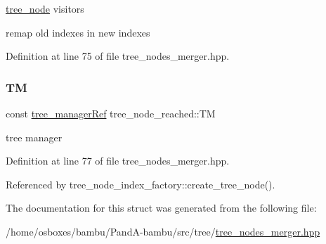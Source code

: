\hyperlink{classtree__node}{tree\+\_\+node} visitors 

remap old indexes in new indexes 

Definition at line 75 of file tree\+\_\+nodes\+\_\+merger.\+hpp.

\mbox{\label{structtree__node__reached_a2248f7cf1f977c15d487f5bdcc6ed586}} 
\subsubsection{\texorpdfstring{TM}{TM}}
{\footnotesize\ttfamily const \hyperlink{tree__manager_8hpp_a96ff150c071ce11a9a7a1e40590f205e}{tree\+\_\+manager\+Ref} tree\+\_\+node\+\_\+reached\+::\+TM\hspace{0.3cm}{\ttfamily [private]}}



tree manager 



Definition at line 77 of file tree\+\_\+nodes\+\_\+merger.\+hpp.



Referenced by tree\+\_\+node\+\_\+index\+\_\+factory\+::create\+\_\+tree\+\_\+node().



The documentation for this struct was generated from the following file\+:\begin{DoxyCompactItemize}
\item 
/home/osboxes/bambu/\+Pand\+A-\/bambu/src/tree/\hyperlink{tree__nodes__merger_8hpp}{tree\+\_\+nodes\+\_\+merger.\+hpp}\end{DoxyCompactItemize}
